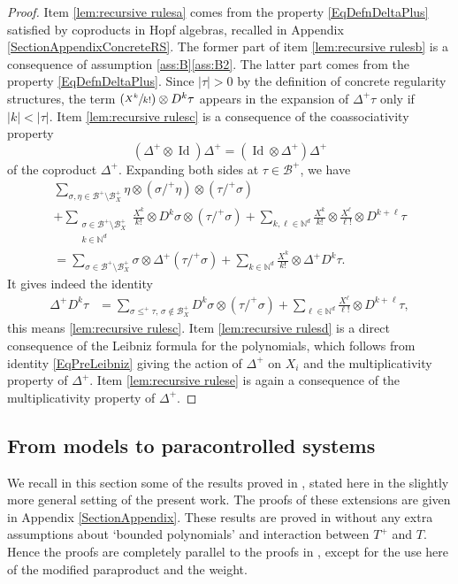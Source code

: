 \documentclass[11pt]{article}
\numberwithin{equation}{section}
\newcommand{\Psfrac}[2]{(\sfrac{#1}{#2})}
\theoremstyle{plain}
\theoremstyle{definition}
\DeclareMathOperator{\iden}{Id}
\newcommand{\bbN}{\mathbb{N}}
\newcommand{\mcB}{\mathcal{B}}
\begin{document}
\begin{proof}
Item \eqref{lem:recursive rulesa} comes from the property \eqref{EqDefnDeltaPlus} satisfied by coproducts in Hopf algebras, recalled in Appendix \ref{SectionAppendixConcreteRS}. The former part of item \eqref{lem:recursive rulesb} is a consequence of assumption \ref{ass:B}\eqref{ass:B2}.
The latter part comes from the property \eqref{EqDefnDeltaPlus}. Since $|\tau|>0$ by the definition of concrete regularity structures, the term $\Psfrac{X^k}{k!}\otimes D^k\tau$ appears in the expansion of $\Delta^+\tau$ only if $|k|<|\tau|$.
Item \eqref{lem:recursive rulesc} is a consequence of the coassociativity property
\[
(\Delta^+\otimes\iden)\Delta^+ = (\iden\otimes\Delta^+)\Delta^+
\]
of the coproduct $\Delta^+$. Expanding both sides at $\tau\in\mcB^+$, we have
\begin{multline*}
\sum_{\sigma,\eta\in\mcB^+\setminus\mcB_X^+}\eta\otimes(\sigma/^+\eta)\otimes(\tau/^+\sigma)\\[-10pt]
+\sum_{\substack{\sigma\in\mcB^+\setminus\mcB_X^+\\k\in\bbN^d}}\frac{X^k}{k!}\otimes D^k\sigma\otimes(\tau/^+\sigma)
+\sum_{k,\ell\in\bbN^d}\frac{X^k}{k!}\otimes\frac{X^\ell}{\ell!}\otimes D^{k+\ell}\tau\\[-10pt]
=\sum_{\sigma\in\mcB^+\setminus\mcB_X^+}\sigma\otimes\Delta^+(\tau/^+\sigma)
+\sum_{k\in\bbN^d}\frac{X^k}{k!}\otimes \Delta^+D^k\tau.
\end{multline*}
It gives indeed the identity
\begin{align}
\label{defi:D^ktau}
\Delta^+D^k\tau &= \sum_{\sigma\leq^+\tau,\, \sigma\notin\mcB_X^+}D^k\sigma\otimes(\tau/^+\sigma) + \sum_{\ell\in\bbN^d}\frac{X^{\ell}}{\ell!}\otimes D^{k+\ell}\tau,
\end{align}
this means \eqref{lem:recursive rulesc}. Item \eqref{lem:recursive rulesd} is a direct consequence of the Leibniz formula for the polynomials, which follows from identity \eqref{EqPreLeibniz} giving the action of $\Delta^+$ on $X_i$ and the multiplicativity property of $\Delta^+$. Item \eqref{lem:recursive rulese} is again a consequence of the multiplicativity property of $\Delta^+$.
\end{proof}

\subsection{From models to paracontrolled systems}
\label{SubsectionFromModelsToPCSystems}

We recall in this section some of the results proved in \cite{BH}, stated here in the slightly more general setting of the present work.
The proofs of these extensions are given in Appendix \ref{SectionAppendix}. These results are proved in \cite[\S\S2\,\&\,3]{BH} without any extra assumptions about `bounded polynomials' and interaction between $T^+$ and $T$. Hence the proofs are completely parallel to the proofs in \cite{BH}, except for the use here of the modified paraproduct and the weight.
\end{document}
